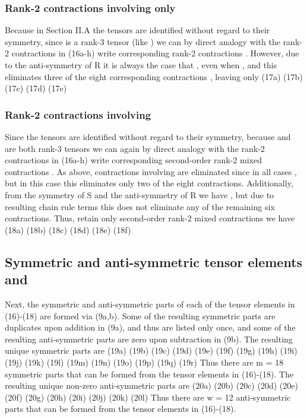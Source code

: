 \subsubsection{Rank-2 contractions involving only  }

Because in Section II.A the tensors   are identified without regard to their symmetry, since   is a rank-3 tensor (like  ) we can by direct analogy with the rank-2 contractions   in (16a-h) write corresponding rank-2 contractions  .  However, due to the anti-symmetry of R it is always the case that  , even when  , and this eliminates three of the eight corresponding contractions  , leaving only
	 	(17a)
	 	(17b) 
	 	(17c) 
	 	(17d) 
	 	(17e) 

\subsubsection{Rank-2 contractions involving   }

Since the tensors   are identified without regard to their symmetry, because   and   are both rank-3 tensors we can again by direct analogy with the rank-2 contractions in (16a-h) write corresponding second-order rank-2 mixed contractions  . As above, contractions involving   are eliminated since in all cases  , but in this case this eliminates only two of the eight contractions.  Additionally, from the symmetry of S and the anti-symmetry of R we have  , but due to resulting chain rule terms this does not eliminate any of the remaining six contractions.  Thus, retain only second-order rank-2 mixed contractions   we have
	 	(18a)
	 	(18b) 
	 	(18c) 
	 	(18d) 
	 	(18e) 
	 	(18f)  

\subsection{Symmetric and anti-symmetric tensor elements   and   }

Next, the symmetric and anti-symmetric parts of each of the tensor elements   in (16)-(18) are formed via (9a,b).  Some of the resulting symmetric parts   are duplicates upon addition in (9a), and thus are listed only once, and some of the resulting anti-symmetric parts   are zero upon subtraction in (9b).  The resulting unique symmetric parts are
	  	(19a) 
	  	(19b) 
	  	(19c) 
	  	(19d) 
	  	(19e) 
	  	(19f) 
	  	(19g) 
	  	(19h) 
	  	(19i) 
	  	(19j) 
	  	(19k) 
	  	(19l) 
	  	(19m) 
	  	(19n)  
	  	(19o) 
	  	(19p) 
	  	(19q)
	  	(19r) 
Thus there are m = 18 symmetric parts that can be formed from the tensor elements   in (16)-(18).  The resulting unique non-zero anti-symmetric parts are 
	  	(20a) 
	  	(20b) 
	  	(20c) 
	  	(20d) 
	  	(20e) 
	  	(20f) 
	  	(20g) 
	  	(20h) 
	  	(20i) 
	  	(20j) 
	  	(20k) 
	  	(20l)
Thus there are w = 12 anti-symmetric parts that can be formed from the tensor elements   in (16)-(18).  


